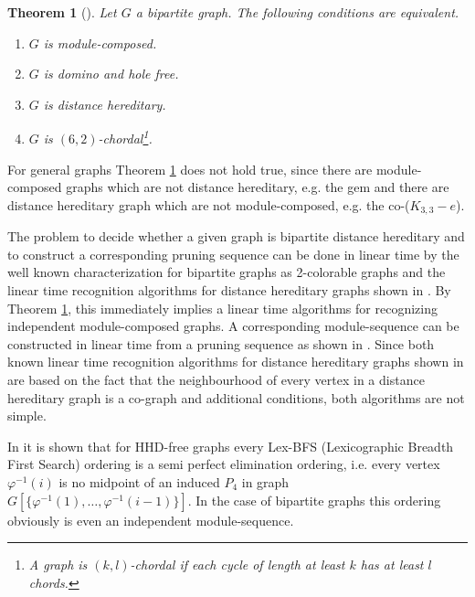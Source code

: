 \documentclass[11pt]{article}
\newtheorem{theorem}{Theorem}[section]
\begin{document}
\begin{theorem}[\cite{AGKKW06}]\label{bipm}  Let $G$ a bipartite graph. The following conditions are equivalent.
\begin{enumerate}
\item $G$ is module-composed.

\item $G$ is domino and hole free.

\item $G$ is distance hereditary.

\item $G$ is   $(6,2)$-chordal\footnote{ A graph is $(k,l)$-chordal if each cycle
of length at least $k$ has at least $l$ chords.}.
\end{enumerate}
\end{theorem}

For general graphs Theorem \ref{bipm} does not hold true, since 
there are module-composed graphs which are not distance hereditary, e.g. the gem and there
are  distance hereditary graph which are not module-composed, e.g. the
co-($K_{3,3}-e$).










\bigskip
The problem to decide whether a given graph is bipartite distance hereditary
and to construct a corresponding pruning sequence can be done in linear time
by the well known characterization for bipartite graphs as 2-colorable graphs and
the linear time recognition algorithms for distance hereditary graphs shown in \cite{HM90,BM86}.
By Theorem \ref{bipm}, this immediately implies a linear time algorithms for recognizing
independent module-composed graphs. A corresponding module-sequence can be constructed 
in linear time from a pruning sequence as shown in \cite{AGKKW06}.
Since both known linear time recognition algorithms for distance hereditary graphs shown 
in \cite{HM90,BM86} are based on the fact that the neighbourhood of every vertex in 
a  distance hereditary graph is a co-graph and additional conditions, both algorithms 
are not simple.


In \cite{JO88} it is shown that for HHD-free graphs every Lex-BFS (Lexicographic Breadth First Search) 
ordering is a semi perfect elimination ordering, i.e. every vertex $\varphi^{-1}(i)$ is no midpoint  of an
induced $P_4$ in graph 
$G[\{\varphi^{-1}(1),\ldots,\varphi^{-1}(i-1)\}]$. In the case of bipartite graphs 
this ordering obviously is even an independent module-sequence.
\end{document}
